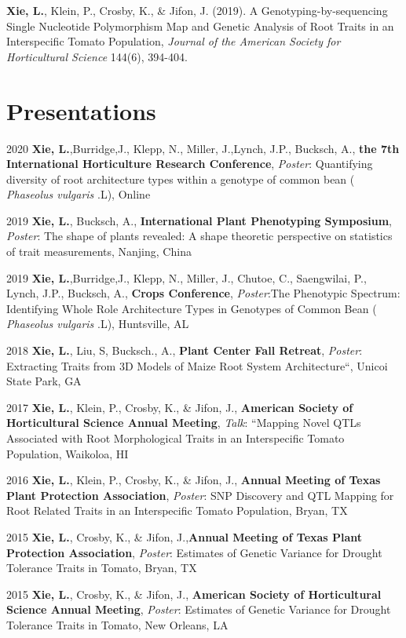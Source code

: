 \documentclass[11pt, a4paper]{awesome-cv}
\begin{document}
\textbf{Xie, L.}, Klein, P., Crosby, K., \& Jifon, J. (2019). A
Genotyping-by-sequencing Single Nucleotide Polymorphism Map and Genetic
Analysis of Root Traits in an Interspecific Tomato Population,
\emph{Journal of the American Society for Horticultural Science} 144(6),
394-404.

\section{Presentations}\label{presentations}

2020 \textbf{Xie, L.},Burridge,J., Klepp, N., Miller, J.,Lynch, J.P.,
Bucksch, A., \textbf{the 7th International Horticulture Research
Conference}, \emph{Poster}: Quantifying diversity of root architecture
types within a genotype of common bean ( \emph{Phaseolus vulgaris} .L),
Online

2019 \textbf{Xie, L.}, Bucksch, A., \textbf{International Plant
Phenotyping Symposium}, \emph{Poster}: The shape of plants revealed: A
shape theoretic perspective on statistics of trait measurements,
Nanjing, China

2019 \textbf{Xie, L.},Burridge,J., Klepp, N., Miller, J., Chutoe, C.,
Saengwilai, P., Lynch, J.P., Bucksch, A., \textbf{Crops Conference},
\emph{Poster}:The Phenotypic Spectrum: Identifying Whole Role
Architecture Types in Genotypes of Common Bean ( \emph{Phaseolus
vulgaris} .L), Huntsville, AL

2018 \textbf{Xie, L.}, Liu, S, Bucksch., A., \textbf{Plant Center Fall
Retreat}, \emph{Poster}: Extracting Traits from 3D Models of Maize Root
System Architecture``, Unicoi State Park, GA

2017 \textbf{Xie, L.}, Klein, P., Crosby, K., \& Jifon, J.,
\textbf{American Society of Horticultural Science Annual Meeting},
\emph{Talk}: ``Mapping Novel QTLs Associated with Root Morphological
Traits in an Interspecific Tomato Population, Waikoloa, HI

2016 \textbf{Xie, L.}, Klein, P., Crosby, K., \& Jifon, J.,
\textbf{Annual Meeting of Texas Plant Protection Association},
\emph{Poster}: SNP Discovery and QTL Mapping for Root Related Traits in
an Interspecific Tomato Population, Bryan, TX

2015 \textbf{Xie, L.}, Crosby, K., \& Jifon, J.,\textbf{Annual Meeting
of Texas Plant Protection Association}, \emph{Poster}: Estimates of
Genetic Variance for Drought Tolerance Traits in Tomato, Bryan, TX

2015 \textbf{Xie, L.}, Crosby, K., \& Jifon, J., \textbf{American
Society of Horticultural Science Annual Meeting}, \emph{Poster}:
Estimates of Genetic Variance for Drought Tolerance Traits in Tomato,
New Orleans, LA
\end{document}
